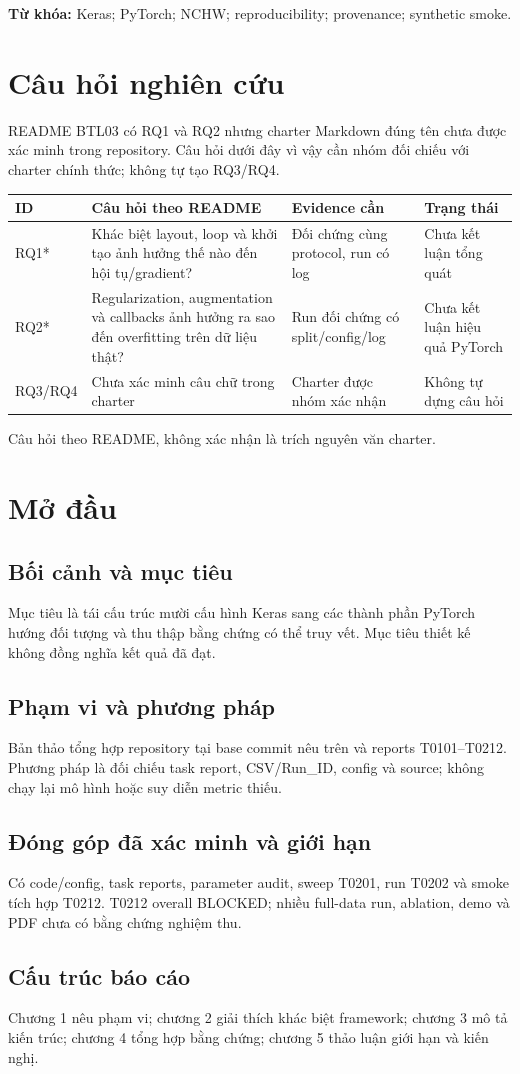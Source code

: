 \noindent\textbf{Từ khóa:} Keras; PyTorch; NCHW; reproducibility; provenance; synthetic smoke.

\chapter*{Câu hỏi nghiên cứu}
README BTL03 có RQ1 và RQ2 nhưng charter Markdown đúng tên chưa được xác minh trong repository. Câu hỏi dưới đây vì vậy cần nhóm đối chiếu với charter chính thức; không tự tạo RQ3/RQ4.
\begin{longtable}{p{}p{}p{}p{}}
\toprule ID & Câu hỏi theo README & Evidence cần & Trạng thái \\
\midrule
RQ1* & Khác biệt layout, loop và khởi tạo ảnh hưởng thế nào đến hội tụ/gradient? & Đối chứng cùng protocol, run có log & Chưa kết luận tổng quát \\
RQ2* & Regularization, augmentation và callbacks ảnh hưởng ra sao đến overfitting trên dữ liệu thật? & Run đối chứng có split/config/log & Chưa kết luận hiệu quả PyTorch \\
RQ3/RQ4 & Chưa xác minh câu chữ trong charter & Charter được nhóm xác nhận & Không tự dựng câu hỏi \\
\bottomrule
\end{longtable}
\noindent * Câu hỏi theo README, không xác nhận là trích nguyên văn charter.

\chapter*{Mở đầu}
\section*{Bối cảnh và mục tiêu}
Mục tiêu là tái cấu trúc mười cấu hình Keras sang các thành phần PyTorch hướng đối tượng và thu thập bằng chứng có thể truy vết. Mục tiêu thiết kế không đồng nghĩa kết quả đã đạt.
\section*{Phạm vi và phương pháp}
Bản thảo tổng hợp repository tại base commit nêu trên và reports T0101--T0212. Phương pháp là đối chiếu task report, CSV/Run\_ID, config và source; không chạy lại mô hình hoặc suy diễn metric thiếu.
\section*{Đóng góp đã xác minh và giới hạn}
Có code/config, task reports, parameter audit, sweep T0201, run T0202 và smoke tích hợp T0212. T0212 overall BLOCKED; nhiều full-data run, ablation, demo và PDF chưa có bằng chứng nghiệm thu.
\section*{Cấu trúc báo cáo}
Chương 1 nêu phạm vi; chương 2 giải thích khác biệt framework; chương 3 mô tả kiến trúc; chương 4 tổng hợp bằng chứng; chương 5 thảo luận giới hạn và kiến nghị.